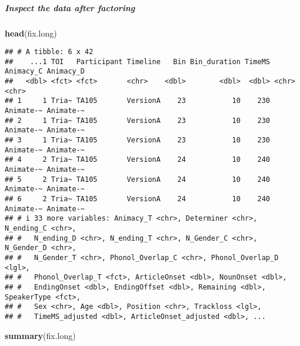 \documentclass[
]{article}
\newenvironment{Shaded}{\begin{snugshade}}{\end{snugshade}}
\newcommand{\FunctionTok}[1]{\textcolor[rgb]{0.13,0.29,0.53}{\textbf{#1}}}
\newcommand{\NormalTok}[1]{#1}
\begin{document}
\subparagraph{Inspect the data after
factoring}\label{inspect-the-data-after-factoring}

\begin{Shaded}
\begin{Highlighting}[]
\FunctionTok{head}\NormalTok{(fix.long)}
\end{Highlighting}
\end{Shaded}

\begin{verbatim}
## # A tibble: 6 x 42
##    ...1 TOI   Participant Timeline   Bin Bin_duration TimeMS Animacy_C Animacy_D
##   <dbl> <fct> <fct>       <chr>    <dbl>        <dbl>  <dbl> <chr>     <chr>    
## 1     1 Tria~ TA105       VersionA    23           10    230 Animate-~ Animate-~
## 2     1 Tria~ TA105       VersionA    23           10    230 Animate-~ Animate-~
## 3     1 Tria~ TA105       VersionA    23           10    230 Animate-~ Animate-~
## 4     2 Tria~ TA105       VersionA    24           10    240 Animate-~ Animate-~
## 5     2 Tria~ TA105       VersionA    24           10    240 Animate-~ Animate-~
## 6     2 Tria~ TA105       VersionA    24           10    240 Animate-~ Animate-~
## # i 33 more variables: Animacy_T <chr>, Determiner <chr>, N_ending_C <chr>,
## #   N_ending_D <chr>, N_ending_T <chr>, N_Gender_C <chr>, N_Gender_D <chr>,
## #   N_Gender_T <chr>, Phonol_Overlap_C <chr>, Phonol_Overlap_D <lgl>,
## #   Phonol_Overlap_T <fct>, ArticleOnset <dbl>, NounOnset <dbl>,
## #   EndingOnset <dbl>, EndingOffset <dbl>, Remaining <dbl>, SpeakerType <fct>,
## #   Sex <chr>, Age <dbl>, Position <chr>, Trackloss <lgl>,
## #   TimeMS_adjusted <dbl>, ArticleOnset_adjusted <dbl>, ...
\end{verbatim}

\begin{Shaded}
\begin{Highlighting}[]
\FunctionTok{summary}\NormalTok{(fix.long)}
\end{Highlighting}
\end{Shaded}
\end{document}
